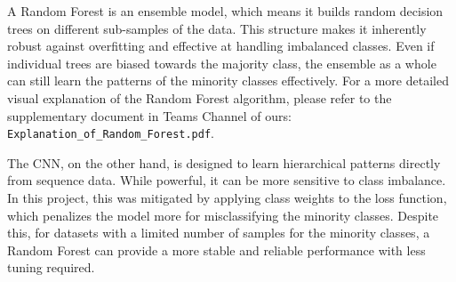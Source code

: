 \documentclass{article}
\begin{document}
A Random Forest is an ensemble model, which means it builds random decision trees on different sub-samples of the data. This structure makes it inherently robust against overfitting and effective at handling imbalanced classes. Even if individual trees are biased towards the majority class, the ensemble as a whole can still learn the patterns of the minority classes effectively. For a more detailed visual explanation of the Random Forest algorithm, please refer to the supplementary document in Teams Channel of ours: \texttt{Explanation\_of\_Random\_Forest.pdf}.

The CNN, on the other hand, is designed to learn hierarchical patterns directly from sequence data. While powerful, it can be more sensitive to class imbalance. In this project, this was mitigated by applying class weights to the loss function, which penalizes the model more for misclassifying the minority classes. Despite this, for datasets with a limited number of samples for the minority classes, a Random Forest can provide a more stable and reliable performance with less tuning required.
\end{document}
